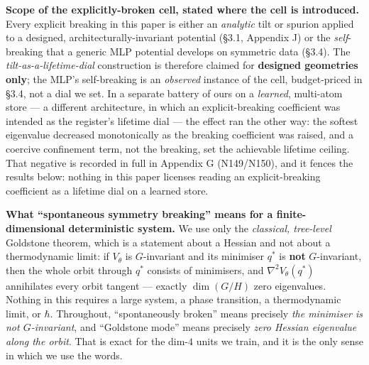 \documentclass[10pt]{article}
\begin{document}
\textbf{Scope of the explicitly-broken cell, stated where the cell is introduced.} Every explicit breaking in this paper is either an \emph{analytic} tilt or spurion applied to a designed, architecturally-invariant potential (\S3.1, Appendix J) or the \emph{self}-breaking that a generic MLP potential develops on symmetric data (\S3.4). The \emph{tilt-as-a-lifetime-dial} construction is therefore claimed for \textbf{designed geometries only}; the MLP's self-breaking is an \emph{observed} instance of the cell, budget-priced in \S3.4, not a dial we set. In a separate battery of ours on a \emph{learned}, multi-atom store --- a different architecture, in which an explicit-breaking coefficient was intended as the register's lifetime dial --- the effect ran the other way: the softest eigenvalue decreased monotonically as the breaking coefficient was raised, and a coercive confinement term, not the breaking, set the achievable lifetime ceiling. That negative is recorded in full in Appendix G (N149/N150), and it fences the results below: nothing in this paper licenses reading an explicit-breaking coefficient as a lifetime dial on a learned store.

\textbf{What ``spontaneous symmetry breaking'' means for a finite-dimensional deterministic system.} We use only the \emph{classical, tree-level} Goldstone theorem, which is a statement about a Hessian and not about a thermodynamic limit: if $V_\theta$ is $G$-invariant and its minimiser $q^*$ is \textbf{not} $G$-invariant, then the whole orbit through $q^*$ consists of minimisers, and $\nabla^2V_\theta(q^*)$ annihilates every orbit tangent --- exactly $\dim(G/H)$ zero eigenvalues. Nothing in this requires a large system, a phase transition, a thermodynamic limit, or $\hbar$. Throughout, ``spontaneously broken'' means precisely \emph{the minimiser is not $G$-invariant}, and ``Goldstone mode'' means precisely \emph{zero Hessian eigenvalue along the orbit}. That is exact for the dim-$4$ units we train, and it is the only sense in which we use the words.
\end{document}
